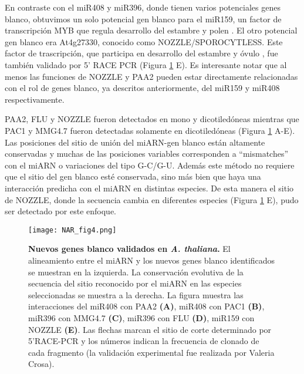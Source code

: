 En contraste con el miR408 y miR396, donde tienen varios potenciales genes blanco, obtuvimos un solo potencial gen blanco para el miR159, un factor de transcripción MYB que regula desarrollo del estambre y polen \citep{Millar2005}.
El otro potencial gen blanco era At4g27330, conocido como NOZZLE/SPOROCYTLESS.
Este factor de trascripción, que participa en desarrollo del estambre y óvulo \citep{Biology1999,Yang1999}, fue también validado por 5' RACE PCR (Figura \ref{fig:NAR_fig4} E).
Es interesante notar que al menos las funciones de NOZZLE y PAA2 pueden estar directamente relacionadas con el rol de genes blanco, ya descritos anteriormente, del miR159 y miR408 respectivamente.

PAA2, FLU y NOZZLE fueron detectados en mono y dicotiledóneas mientras que PAC1 y MMG4.7 fueron detectadas solamente en dicotiledóneas (Figura \ref{fig:NAR_fig4} A-E).
Las posiciones del sitio de unión del miARN-gen blanco están altamente conservadas y muchas de las posiciones variables corresponden a ``mismatches'' con el miARN o variaciones del tipo G-C/G-U.
Además este método no requiere que el sitio del gen blanco esté conservada, sino más bien que haya una interacción predicha con el miARN en distintas especies.
De esta manera el sitio de NOZZLE, donde la secuencia cambia en diferentes especies (Figura \ref{fig:NAR_fig4} E), pudo ser detectado por este enfoque.

\begin{figure}[htbp!] 
    \centering    
    \texttt{[image: NAR\_fig4.png]}
    \caption[Nuevos genes blanco validados en \textit{A. thaliana}.]{
    \textbf{Nuevos genes blanco validados en \textit{A. thaliana}.}
    El alineamiento entre el miARN y los nuevos genes blanco identificados se muestran en la izquierda.
    La conservación evolutiva de la secuencia del sitio reconocido por el miARN en las especies seleccionadas se muestra a la derecha. La figura muestra las interacciones del miR408 con PAA2
    \textbf{(A)}, miR408 con PAC1 \textbf{(B)}, miR396 con MMG4.7 \textbf{(C)}, miR396 con FLU \textbf{(D)}, miR159 con NOZZLE \textbf{(E)}.
    Las flechas marcan el sitio de corte determinado por 5’RACE-PCR y los números indican la frecuencia de clonado de cada fragmento (la validación experimental fue realizada por Valeria Crosa).}
    \label{fig:NAR_fig4}
\end{figure}


